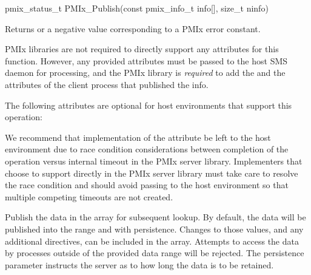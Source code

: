 \format

\cspecificstart
\begin{codepar}
pmix_status_t
PMIx_Publish(const pmix_info_t info[], size_t ninfo)
\end{codepar}
\cspecificend

\begin{arglist}
\end{arglist}

Returns  or a negative value corresponding to a PMIx error constant.

\reqattrstart
\ac{PMIx} libraries are not required to directly support any attributes for this function. However, any provided attributes must be passed to the host \ac{SMS} daemon for processing, and the \ac{PMIx} library is \textit{required} to add the  and the  attributes of the client process that published the info.

\reqattrend

\optattrstart
The following attributes are optional for host environments that support this operation:


\optattrend

\adviceimplstart
We recommend that implementation of the  attribute be left to the host environment due to race condition considerations between completion of the operation versus internal timeout in the \ac{PMIx} server library. Implementers that choose to support  directly in the \ac{PMIx} server library must take care to resolve the race condition and should avoid passing  to the host environment so that multiple competing timeouts are not created.
\adviceimplend

\descr

Publish the data in the  array for subsequent lookup.
By default, the data will be published into the  range and with  persistence.
Changes to those values, and any additional directives, can be included in the  array. Attempts to access the data by processes outside of the provided data range will be rejected. The persistence parameter instructs the server as to how long the data is to be retained.

